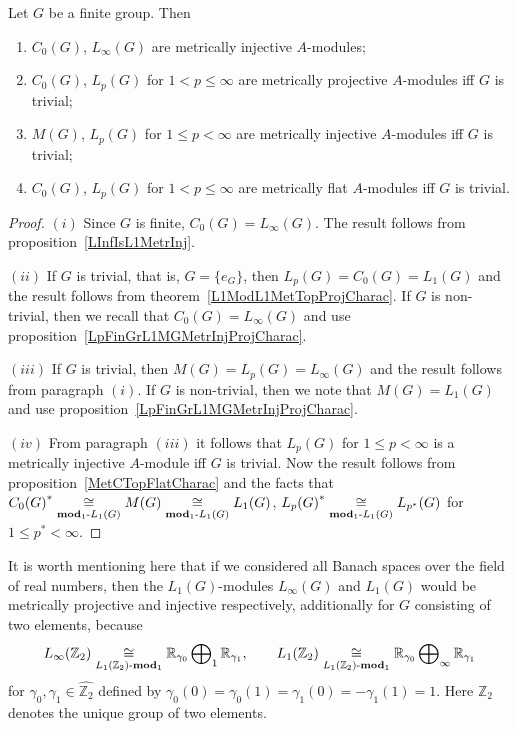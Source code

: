 \begin{proposition}\label{StdModFinGrL1MGMetrInjProjFlatCharac} Let $G$ be a
finite group. Then

\begin{enumerate}[label = (\roman*)]
    \item $C_0(G)$, $L_\infty(G)$ are metrically injective $A$-modules;

    \item $C_0(G)$, $L_p(G)$ for $1<p\leq\infty$ are metrically projective
    $A$-modules iff $G$ is trivial;

    \item $M(G)$, $L_p(G)$ for $1\leq p<\infty$ are metrically injective
    $A$-modules iff $G$ is trivial;

    \item $C_0(G)$, $L_p(G)$ for $1<p\leq\infty$ are metrically 
    flat $A$-modules iff $G$ is trivial.
\end{enumerate}
\end{proposition}
\begin{proof}
$(i)$ Since $G$ is finite, $C_0(G)=L_\infty(G)$. The result follows from
proposition~\ref{LInfIsL1MetrInj}.

$(ii)$ If $G$ is trivial, that is, $G= \{e_G \}$, then $L_p(G)=C_0(G)=L_1(G)$ and
the result follows from theorem~\ref{L1ModL1MetTopProjCharac}. If $G$ is non-trivial, then we recall
that $C_0(G)=L_\infty(G)$ and use
proposition~\ref{LpFinGrL1MGMetrInjProjCharac}.

$(iii)$ If $G$ is trivial, then $M(G)=L_p(G)=L_\infty(G)$ and the result follows
from paragraph $(i)$. If $G$ is non-trivial, then we note that $M(G)=L_1(G)$ and
use proposition~\ref{LpFinGrL1MGMetrInjProjCharac}.

$(iv)$ From paragraph $(iii)$ it follows that $L_p(G)$ for $1\leq p<\infty$ is a 
metrically injective $A$-module iff $G$ is trivial. Now the result follows from
proposition~\ref{MetCTopFlatCharac} and the facts that
${C_0(G)}^*\mathrel{\mathop{\cong}\limits_{\mathbf{mod}_1\text{-}L_1(G)}}M(G)\mathrel{\mathop{\cong}\limits_{\mathbf{mod}_1\text{-}L_1(G)}}L_1(G)$,
${L_p(G)}^*\mathrel{\mathop{\cong}\limits_{\mathbf{mod}_1\text{-}L_1(G)}}L_{p^*}(G)$ for $1\leq p^*<\infty$.
\end{proof}

It is worth mentioning here that if we considered all Banach spaces over the
field of real numbers, then the $L_1(G)$-modules $L_\infty(G)$ and $L_1(G)$ 
would be metrically projective and injective respectively, 
additionally for $G$ consisting of two elements, because
\[
L_\infty(\mathbb{Z}_2)
\mathrel{\mathop{\cong}\limits_{L_1(\mathbb{Z}_2)\text{-}\mathbf{mod}_1}}
\mathbb{R}_{\gamma_0}\bigoplus\nolimits_1\mathbb{R}_{\gamma_1},
\qquad
L_1(\mathbb{Z}_2)
\mathrel{\mathop{\cong}\limits_{L_1(\mathbb{Z}_2)\text{-}\mathbf{mod}_1}}
\mathbb{R}_{\gamma_0}\bigoplus\nolimits_\infty\mathbb{R}_{\gamma_1}
\]
for $\gamma_0,\gamma_1\in\widehat{\mathbb{Z}_2}$ defined by
$\gamma_0(0)=\gamma_0(1)=\gamma_1(0)=-\gamma_1(1)=1$. Here $\mathbb{Z}_2$
denotes the unique group of two elements.

